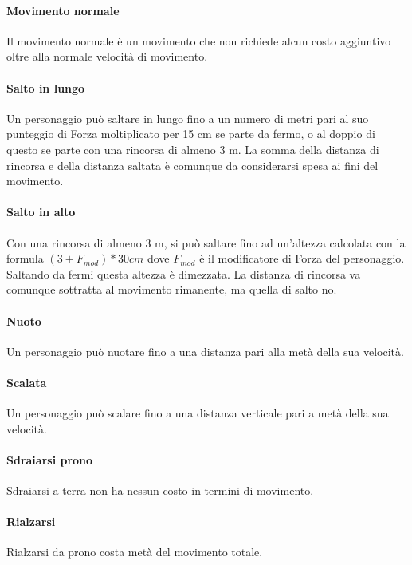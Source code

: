 \paragraph{Movimento normale}
Il movimento normale è un movimento che non richiede alcun costo aggiuntivo oltre alla normale velocità di movimento.\\
\paragraph{Salto in lungo}
Un personaggio può saltare in lungo fino a un numero di metri pari al suo punteggio di Forza moltiplicato per 15 cm se parte da fermo, o al doppio di questo se parte con una rincorsa di almeno 3 m. La somma della distanza di rincorsa e della distanza saltata è comunque da considerarsi spesa ai fini del movimento.\\
\paragraph{Salto in alto}
Con una rincorsa di almeno 3 m, si può saltare fino ad un'altezza calcolata con la formula $(3 + F_{mod})*30cm$ dove $F_{mod}$ è il modificatore di Forza del personaggio. Saltando da fermi questa altezza è dimezzata. La distanza di rincorsa va comunque sottratta al movimento rimanente, ma quella di salto no.\\
\paragraph{Nuoto}
Un personaggio può nuotare fino a una distanza pari alla metà della sua velocità.\\
\paragraph{Scalata}
Un personaggio può scalare fino a una distanza verticale pari a metà della sua velocità.\\
\paragraph{Sdraiarsi prono}
Sdraiarsi a terra non ha nessun costo in termini di movimento.\\
\paragraph{Rialzarsi}
Rialzarsi da prono costa metà del movimento totale.\\
